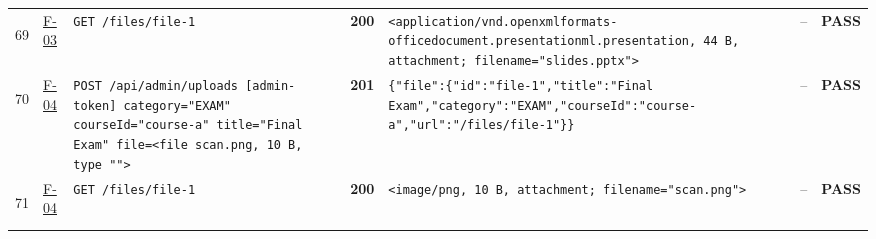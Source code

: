\documentclass[10pt,a4paper]{article}
\begin{document}
\begin{landscape}
\begin{longtable}{@{}P{0.6cm}P{0.9cm}P{8.5cm}P{1.0cm}P{6.2cm}P{4.2cm}P{1.1cm}@{}}
\hypertarget{call69}{69} & \hyperlink{test-F-03}{F-03} & \texttt{GET /\allowbreak{}files/\allowbreak{}file-\allowbreak{}1} & \textcolor{passgreen}{\textbf{200}} & \texttt{<application/\allowbreak{}vnd.\allowbreak{}openxmlformats-\allowbreak{}officedocument.\allowbreak{}presentationml.\allowbreak{}presentation,\allowbreak{} 44 B,\allowbreak{} attachment; filename=\allowbreak{}"\allowbreak{}slides.\allowbreak{}pptx"\allowbreak{}>} & -- & \textcolor{passgreen}{\textbf{PASS}} \\
\hypertarget{call70}{70} & \hyperlink{test-F-04}{F-04} & \texttt{POST /\allowbreak{}api/\allowbreak{}admin/\allowbreak{}uploads [admin-\allowbreak{}token] category=\allowbreak{}"\allowbreak{}EXAM"\allowbreak{} courseId=\allowbreak{}"\allowbreak{}course-\allowbreak{}a"\allowbreak{} title=\allowbreak{}"\allowbreak{}Final Exam"\allowbreak{} file=\allowbreak{}<file scan.\allowbreak{}png,\allowbreak{} 10 B,\allowbreak{} type "\allowbreak{}"\allowbreak{}>} & \textcolor{passgreen}{\textbf{201}} & \texttt{\{"\allowbreak{}file"\allowbreak{}:\allowbreak{}\{"\allowbreak{}id"\allowbreak{}:\allowbreak{}"\allowbreak{}file-\allowbreak{}1"\allowbreak{},\allowbreak{}"\allowbreak{}title"\allowbreak{}:\allowbreak{}"\allowbreak{}Final Exam"\allowbreak{},\allowbreak{}"\allowbreak{}category"\allowbreak{}:\allowbreak{}"\allowbreak{}EXAM"\allowbreak{},\allowbreak{}"\allowbreak{}courseId"\allowbreak{}:\allowbreak{}"\allowbreak{}course-\allowbreak{}a"\allowbreak{},\allowbreak{}"\allowbreak{}url"\allowbreak{}:\allowbreak{}"\allowbreak{}/\allowbreak{}files/\allowbreak{}file-\allowbreak{}1"\allowbreak{}\}\}} & -- & \textcolor{passgreen}{\textbf{PASS}} \\
\hypertarget{call71}{71} & \hyperlink{test-F-04}{F-04} & \texttt{GET /\allowbreak{}files/\allowbreak{}file-\allowbreak{}1} & \textcolor{passgreen}{\textbf{200}} & \texttt{<image/\allowbreak{}png,\allowbreak{} 10 B,\allowbreak{} attachment; filename=\allowbreak{}"\allowbreak{}scan.\allowbreak{}png"\allowbreak{}>} & -- & \textcolor{passgreen}{\textbf{PASS}} \\

\end{longtable}
\end{landscape}
\end{document}
